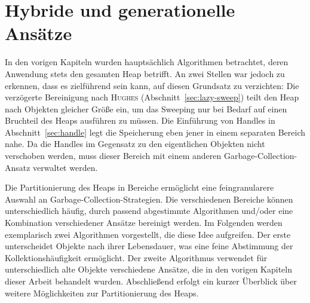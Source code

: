 \chapter{Hybride und generationelle Ansätze}
\label{cha:generational}

In den vorigen Kapiteln wurden hauptsächlich Algorithmen betrachtet, deren Anwendung stets den gesamten Heap betrifft.
An zwei Stellen war jedoch zu erkennen, dass es zielführend sein kann, auf diesen Grundsatz zu verzichten:
Die verzögerte Bereinigung nach \textsc{Hughes} (Abschnitt~\ref{sec:lazy-sweep}) teilt den Heap nach Objekten gleicher Größe ein, um das Sweeping nur bei Bedarf auf einen Bruchteil des Heaps ausführen zu müssen.
Die Einführung von Handles in Abschnitt~\ref{sec:handle} legt die Speicherung eben jener in einem separaten Bereich nahe.
Da die Handles im Gegensatz zu den eigentlichen Objekten nicht verschoben werden, muss dieser Bereich mit einem anderen Garbage-Collection-Ansatz verwaltet werden.

Die Partitionierung des Heaps in Bereiche ermöglicht eine feingranularere Auswahl an Garbage-Collection-Strategien.
Die verschiedenen Bereiche können unterschiedlich häufig, durch passend abgestimmte Algorithmen und/oder eine Kombination verschiedener Ansätze bereinigt werden.
Im Folgenden werden exemplarisch zwei Algorithmen vorgestellt, die diese Idee aufgreifen.
Der erste unterscheidet Objekte nach ihrer Lebensdauer, was eine feine Abstimmung der Kollektionshäufigkeit ermöglicht.
Der zweite Algorithmus verwendet für unterschiedlich alte Objekte verschiedene Ansätze, die in den vorigen Kapiteln dieser Arbeit behandelt wurden.
Abschließend erfolgt ein kurzer Überblick über weitere Möglichkeiten zur Partitionierung des Heaps.




